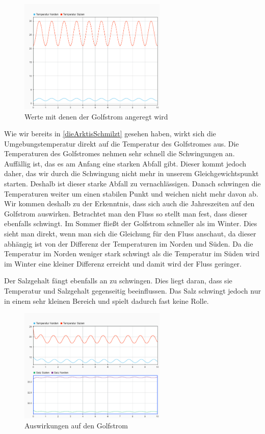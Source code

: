 \documentclass[a4paper,twoside]{article}
\begin{document}
	\begin{figure}[!h]
  		\centering
 		\includegraphics[width=7cm]{../Diagramme/Jahreszeiten_init.png}
  		\caption{Werte mit denen der Golfstrom angeregt wird}
  		\label{fig:jahreszeitenUmgebung}
	\end{figure}
	
	Wie wir bereits in \ref{dieArktisSchmilzt} gesehen haben, wirkt sich die Umgebungstemperatur direkt auf die Temperatur des Golfstromes aus. Die Temperaturen des Golfstromes nehmen sehr schnell die Schwingungen an. Auffällig ist, das es am Anfang eine starken Abfall gibt. Dieser kommt jedoch daher, das wir durch die Schwingung nicht mehr in unserem Gleichgewichtspunkt starten. Deshalb ist dieser starke Abfall zu vernachlässigen. Danach schwingen die Temperaturen weiter um einen stabilen Punkt und weichen nicht mehr davon ab. Wir kommen deshalb zu der Erkenntnis, dass sich auch die Jahreszeiten auf den Golfstrom auswirken. Betrachtet man den Fluss so stellt man fest, dass dieser ebenfalls schwingt. Im Sommer fließt der Golfstrom schneller als im Winter. Dies sieht man direkt, wenn man sich die Gleichung für den Fluss anschaut, da dieser abhängig ist von der Differenz der Temperaturen im Norden und Süden. Da die Temperatur im Norden weniger stark schwingt als die Temperatur im Süden wird im Winter eine kleiner Differenz erreicht und damit wird der Fluss geringer.
	
	Der Salzgehalt fängt ebenfalls an zu schwingen. Dies liegt daran, dass sie Temperatur und Salzgehalt gegenseitig beeinflussen. Das Salz schwingt jedoch nur in einem sehr kleinen Bereich und spielt dadurch fast keine Rolle.

	\begin{figure}[!h]
  		\centering
 		\includegraphics[width=7cm]{../Diagramme/Jahreszeiten_werte.png}
  		\caption{Auswirkungen auf den Golfstrom}
  		\label{fig:jahreszeitenGolf}
	\end{figure}
\end{document}
